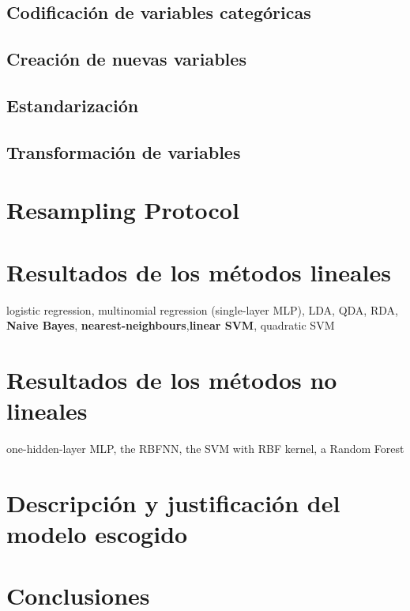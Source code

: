 \documentclass[a4paper]{article}
\begin{document}
\subsection{Codificación de variables categóricas}


\subsection{Creación de nuevas variables}

\subsection{Estandarización}

\subsection{Transformación de variables}

\section{Resampling Protocol}

\section{Resultados de los métodos lineales}
logistic regression, multinomial regression
(single-layer MLP), LDA, QDA, RDA, \textbf{Naive Bayes}, \textbf{nearest-neighbours},\textbf{linear SVM}, quadratic SVM
\section{Resultados de los métodos no lineales}
one-hidden-layer MLP, the RBFNN, the SVM with RBF kernel, a
Random Forest
\section{Descripción y justificación del modelo escogido}

\section{Conclusiones}
\end{document}
